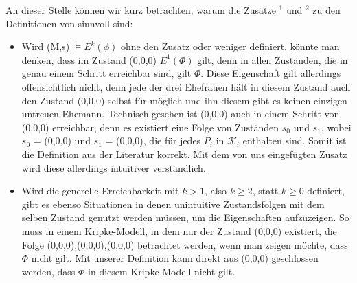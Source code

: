 An dieser Stelle können wir kurz betrachten, warum die Zusätze $^1$ und $^2$ zu den Definitionen von \cite{kshemkalyani2011distributed} sinnvoll sind:
\begin{itemize}
	\item Wird (M,s) $\vDash E^{k}(\phi)$ ohne den Zusatz \glqq oder weniger\grqq{} definiert, könnte man denken, dass im Zustand (0,0,0) $E^1(\Phi)$ gilt, denn in allen Zuständen, die in genau einem Schritt erreichbar sind, gilt $\Phi$. Diese Eigenschaft gilt allerdings offensichtlich nicht, denn jede der drei Ehefrauen hält in diesem Zustand auch den Zustand (0,0,0) selbst für möglich und ihn diesem gibt es keinen einzigen untreuen Ehemann.
	Technisch gesehen ist (0,0,0) auch in einem Schritt von (0,0,0) erreichbar, denn es existiert eine Folge von Zuständen $s_0$ und $s_1$, wobei $s_0$ = (0,0,0) und $s_1$ = (0,0,0), die für jedes $P_i$ in $\mathcal{K}_i$ enthalten sind.
	Somit ist die Definition aus der Literatur korrekt. Mit dem von uns eingefügten Zusatz wird diese allerdings intuitiver verständlich.
	\item Wird die generelle Erreichbarkeit mit $k > 1$, also $k \ge 2$, statt $k \ge 0$ definiert, gibt es ebenso Situationen in denen unintuitive Zustandsfolgen mit dem selben Zustand genutzt werden müssen, um die Eigenschaften aufzuzeigen.
	So muss in einem Kripke-Modell, in dem nur der Zustand (0,0,0) existiert, die Folge (0,0,0),(0,0,0),(0,0,0) betrachtet werden, wenn man zeigen möchte, dass $\Phi$ nicht gilt. Mit unserer Definition kann direkt aus (0,0,0) geschlossen werden, dass $\Phi$ in diesem Kripke-Modell nicht gilt.
\end{itemize}